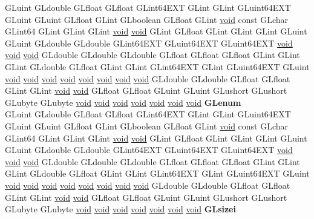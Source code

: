 \begin{DoxyCompactItemize}
\begin{tabbing}
\>GLuint GLdouble GLfloat GLfloat GLint64EXT GLint GLint GLuint64EXT GLuint GLuint GLfloat GLint GLboolean GLfloat GLint \hyperlink{interfacevoid}{void} const GLchar GLint64 GLint GLint GLint \hyperlink{interfacevoid}{void} \hyperlink{interfacevoid}{void} GLint GLfloat GLint GLint GLint GLuint GLuint GLdouble GLdouble GLint64EXT GLuint64EXT GLuint64EXT \hyperlink{interfacevoid}{void} \hyperlink{interfacevoid}{void} \hyperlink{interfacevoid}{void} GLdouble GLdouble GLdouble GLfloat GLfloat GLfloat GLint GLint GLint GLdouble GLfloat GLint GLint GLint64EXT GLint GLuint64EXT GLuint \hyperlink{interfacevoid}{void} \hyperlink{interfacevoid}{void} \hyperlink{interfacevoid}{void} \hyperlink{interfacevoid}{void} \hyperlink{interfacevoid}{void} \hyperlink{interfacevoid}{void} \hyperlink{interfacevoid}{void} \hyperlink{interfacevoid}{void} GLdouble GLdouble GLfloat GLfloat GLint GLint \hyperlink{interfacevoid}{void} \hyperlink{interfacevoid}{void} GLfloat GLfloat GLuint GLuint GLushort GLushort GLubyte GLubyte \hyperlink{interfacevoid}{void} \hyperlink{interfacevoid}{void} \hyperlink{interfacevoid}{void} \hyperlink{interfacevoid}{void} \hyperlink{interfacevoid}{void} \hyperlink{interfacevoid}{void} \hyperlink{interfacevoid}{void} {\bfseries GLenum}\\
\>GLuint GLdouble GLfloat GLfloat GLint64EXT GLint GLint GLuint64EXT GLuint GLuint GLfloat GLint GLboolean GLfloat GLint \hyperlink{interfacevoid}{void} const GLchar GLint64 GLint GLint GLint \hyperlink{interfacevoid}{void} \hyperlink{interfacevoid}{void} GLint GLfloat GLint GLint GLint GLuint GLuint GLdouble GLdouble GLint64EXT GLuint64EXT GLuint64EXT \hyperlink{interfacevoid}{void} \hyperlink{interfacevoid}{void} \hyperlink{interfacevoid}{void} GLdouble GLdouble GLdouble GLfloat GLfloat GLfloat GLint GLint GLint GLdouble GLfloat GLint GLint GLint64EXT GLint GLuint64EXT GLuint \hyperlink{interfacevoid}{void} \hyperlink{interfacevoid}{void} \hyperlink{interfacevoid}{void} \hyperlink{interfacevoid}{void} \hyperlink{interfacevoid}{void} \hyperlink{interfacevoid}{void} \hyperlink{interfacevoid}{void} \hyperlink{interfacevoid}{void} GLdouble GLdouble GLfloat GLfloat GLint GLint \hyperlink{interfacevoid}{void} \hyperlink{interfacevoid}{void} GLfloat GLfloat GLuint GLuint GLushort GLushort GLubyte GLubyte \hyperlink{interfacevoid}{void} \hyperlink{interfacevoid}{void} \hyperlink{interfacevoid}{void} \hyperlink{interfacevoid}{void} \hyperlink{interfacevoid}{void} \hyperlink{interfacevoid}{void} \hyperlink{interfacevoid}{void} {\bfseries GLsizei}\\

\end{tabbing}
\end{DoxyCompactItemize}
